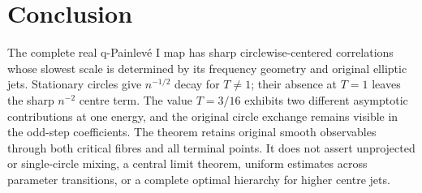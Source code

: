 \section{Conclusion}
\label{sec:conclusion}

The complete real q-Painlev\'e I map has sharp circlewise-centered
correlations whose slowest scale is determined by its frequency
geometry and original elliptic jets. Stationary circles give
$n^{-1/2}$ decay for $T\ne1$; their absence at $T=1$ leaves the
sharp $n^{-2}$ centre term. The value $T=3/16$ exhibits two different
asymptotic contributions at one energy, and the original circle
exchange remains visible in the odd-step coefficients. The theorem
retains original smooth observables through both critical fibres and
all terminal points. It does not assert unprojected or single-circle
mixing, a central limit theorem, uniform estimates across parameter
transitions, or a complete optimal hierarchy for higher centre jets.
